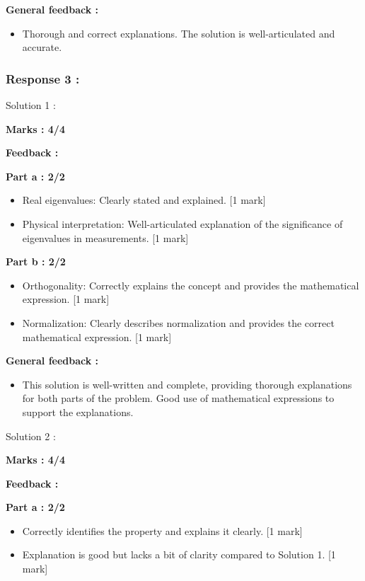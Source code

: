 \documentclass[a4paper,11pt]{article}
\begin{document}
\textbf{General feedback :}

\begin{itemize}
    \item Thorough and correct explanations. The solution is well-articulated and accurate.
\end{itemize}



\subsubsection*{Response 3 :}

Solution 1 : 

\textbf{Marks : 4/4}

\textbf{Feedback : }

\textbf{Part a : 2/2}

\begin{itemize}
    \item Real eigenvalues: Clearly stated and explained. [1 mark]
    \item Physical interpretation: Well-articulated explanation of the significance of eigenvalues in measurements. [1 mark]
\end{itemize}


\textbf{Part b : 2/2}

\begin{itemize}
    \item Orthogonality: Correctly explains the concept and provides the mathematical expression. [1 mark]
    \item Normalization: Clearly describes normalization and provides the correct mathematical expression. [1 mark]
\end{itemize}


\textbf{General feedback :}

\begin{itemize}
    \item This solution is well-written and complete, providing thorough explanations for both parts of the problem. Good use of mathematical expressions to support the explanations.
\end{itemize}


Solution 2 : 

\textbf{Marks : 4/4}

\textbf{Feedback : }

\textbf{Part a : 2/2}

\begin{itemize}
    \item Correctly identifies the property and explains it clearly. [1 mark]
    \item Explanation is good but lacks a bit of clarity compared to Solution 1. [1 mark]
\end{itemize}
\end{document}
